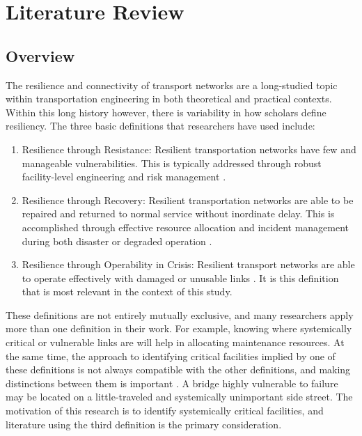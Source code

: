 \chapter{Literature Review}
\label{chp:chapter2}
\graphicspath{{figures/}{figures/chapter2/}}

\section{Overview}
\label{sec:ch2overview}


The resilience and connectivity of transport networks are a long-studied
topic within
transportation engineering in both theoretical and practical contexts.
Within this long history
however, there is variability in how scholars define resiliency. The
three basic
definitions that researchers have used include:

\begin{enumerate}
	\item Resilience through Resistance: Resilient transportation networks
	have few and manageable vulnerabilities. This is typically addressed
	through robust facility-level engineering and risk management
	\citep{bradley2007, peeta2010}.
	\item Resilience through Recovery: Resilient transportation networks are
	able to be repaired and returned to normal service without inordinate
	delay. This is accomplished through effective resource allocation and
	incident management during both disaster or degraded operation
	\citep{zhang2016}.
	\item Resilience through Operability in Crisis: Resilient transport
	networks are able to operate effectively with damaged or unusable links
	\citep{berdica2002, ip2011}.
	It is this definition that is most relevant in the context of this study.
\end{enumerate}

These definitions are not entirely mutually exclusive, and many
researchers apply more than one
definition in their work. For example, knowing where systemically critical
or vulnerable links
are will help in allocating maintenance resources. At the same time, the
approach to identifying
critical facilities implied by one of these definitions is not always
compatible with the other
definitions, and making distinctions between them is important
\citep{rogers2012}. A bridge
highly vulnerable to failure may be located on a little-traveled and
systemically unimportant
side street. The motivation of this research is to identify systemically
critical facilities, and literature using the third definition is the primary consideration.

